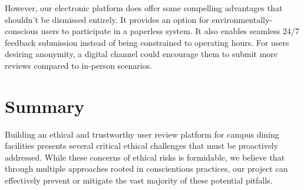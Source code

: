 \documentclass[10pt,twocolumn]{article}
\begin{document}
However, our electronic platform does offer some compelling advantages that shouldn't be dismissed entirely. It provides an option for environmentally-conscious users to participate in a paperless system. It also enables seamless 24/7 feedback submission instead of being constrained to operating hours. For users desiring anonymity, a digital channel could encourage them to submit more reviews compared to in-person scenarios.


\section{Summary}
Building an ethical and trustworthy user review platform for campus dining facilities presents several critical ethical challenges that must be proactively addressed. While these concerns of ethical risks is formidable, we believe that through multiple approaches rooted in conscientious practices, our project can effectively prevent or mitigate the vast majority of these potential pitfalls.
\end{document}
